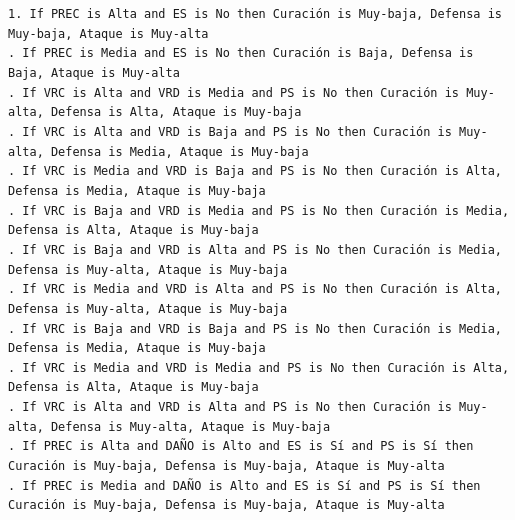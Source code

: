 \noindent\texttt{1. If PREC is Alta and ES is No then Curación is Muy-baja, Defensa is Muy-baja, Ataque is Muy-alta\\. If PREC is Media and ES is No then Curación is Baja, Defensa is Baja, Ataque is Muy-alta\\. If VRC is Alta and VRD is Media and PS is No then Curación is Muy-alta, Defensa is Alta, Ataque is Muy-baja\\. If VRC is Alta and VRD is Baja and PS is No then Curación is Muy-alta, Defensa is Media, Ataque is Muy-baja\\. If VRC is Media and VRD is Baja and PS is No then Curación is Alta, Defensa is Media, Ataque is Muy-baja\\. If VRC is Baja and VRD is Media and PS is No then Curación is Media, Defensa is Alta, Ataque is Muy-baja\\. If VRC is Baja and VRD is Alta and PS is No then Curación is Media, Defensa is Muy-alta, Ataque is Muy-baja\\. If VRC is Media and VRD is Alta and PS is No then Curación is Alta, Defensa is Muy-alta, Ataque is Muy-baja\\. If VRC is Baja and VRD is Baja and PS is No then Curación is Media, Defensa is Media, Ataque is Muy-baja\\. If VRC is Media and VRD is Media and PS is No then Curación is Alta, Defensa is Alta, Ataque is Muy-baja\\. If VRC is Alta and VRD is Alta and PS is No then Curación is Muy-alta, Defensa is Muy-alta, Ataque is Muy-baja\\. If PREC is Alta and DAÑO is Alto and ES is Sí and PS is Sí then Curación is Muy-baja, Defensa is Muy-baja, Ataque is Muy-alta\\. If PREC is Media and DAÑO is Alto and ES is Sí and PS is Sí then Curación is Muy-baja, Defensa is Muy-baja, Ataque is Muy-alta\\\newline
}
